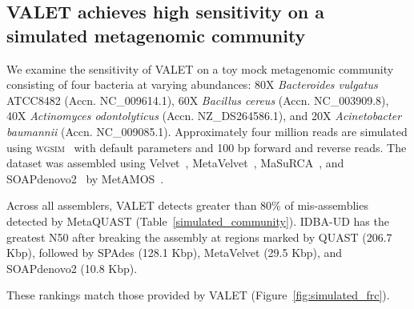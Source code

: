 \documentclass{article}
\begin{document}
\subsection{VALET achieves high sensitivity on a simulated metagenomic community}

We examine the sensitivity of VALET on a toy mock metagenomic community consisting of four bacteria at varying abundances: 80X \emph{Bacteroides vulgatus}  ATCC8482 (Accn. NC_009614.1), 60X \emph{Bacillus cereus} (Accn. NC_003909.8), 40X \emph{Actinomyces odontolyticus} (Accn. NZ_DS264586.1), and 20X \emph{Acinetobacter baumannii} (Accn. NC_009085.1).
Approximately four million reads are simulated using \textsc{wgsim}~\citep{li2013wgsim} with default parameters and 100 bp forward and reverse reads.
The dataset was assembled using Velvet~\citep{zerbino2008velvet}, MetaVelvet~\citep{namiki2012metavelvet}, MaSuRCA~\citep{zimin2013masurca}, and SOAPdenovo2~\citep{luo2012soapdenovo2} by MetAMOS~\citep{treangen2013metamos}.

Across all assemblers, VALET detects greater than 80\% of mis-assemblies detected by MetaQUAST (Table~\ref{simulated_community}).%
IDBA-UD has the greatest N50 after breaking the assembly at regions marked by QUAST (206.7 Kbp), followed by SPAdes (128.1 Kbp), MetaVelvet (29.5 Kbp), and SOAPdenovo2 (10.8 Kbp).

These rankings match those provided by VALET (Figure~\ref{fig:simulated_frc}).

\end{document}
